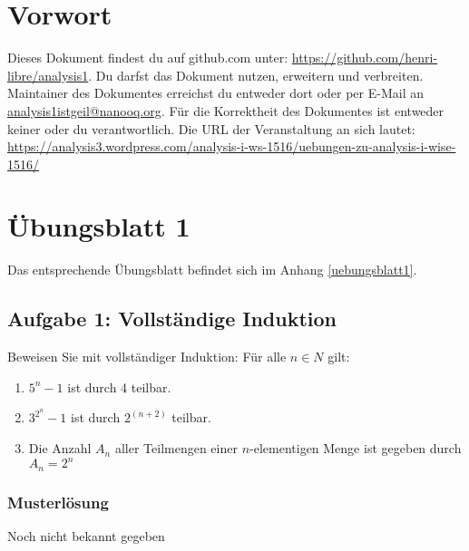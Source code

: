 \documentclass[12pt,a4paper]{report}
\begin{document}
	\tableofcontents
	\newpage
	
	\chapter{Vorwort}
	Dieses Dokument findest du auf github.com unter: \href{https://github.com/henri-libre/analysis1}{https://github.com/henri-libre/analysis1}. Du darfst das Dokument nutzen, erweitern und verbreiten. Maintainer des Dokumentes erreichst du entweder dort oder per E-Mail an \href{analysis1istgeil@nanooq.org}{analysis1istgeil@nanooq.org}. Für die Korrektheit des Dokumentes ist entweder keiner oder du verantwortlich. Die URL der Veranstaltung an sich lautet: \href{https://analysis3.wordpress.com/analysis-i-ws-1516/uebungen-zu-analysis-i-wise-1516/}{https://analysis3.wordpress.com/analysis-i-ws-1516/uebungen-zu-analysis-i-wise-1516/}
	
\chapter{Übungsblatt 1}
	
	Das entsprechende Übungsblatt befindet sich im Anhang \ref{uebungsblatt1}.
	
	\section{Aufgabe 1: Vollständige Induktion}
	Beweisen Sie mit vollständiger Induktion: Für alle $ n \in N $ gilt:
	\begin{enumerate}
	\item $ 5^n - 1 $ ist durch 4 teilbar.
	\item $ 3^{2^n} - 1 $ ist durch $ 2^(n+2)$ teilbar.
	\item Die Anzahl $A_n$ aller Teilmengen einer $n$-elementigen Menge ist gegeben durch $A_n=2^n$
	\end{enumerate}
	
	\subsection{Musterlösung}
	Noch nicht bekannt gegeben
	
\end{document}

